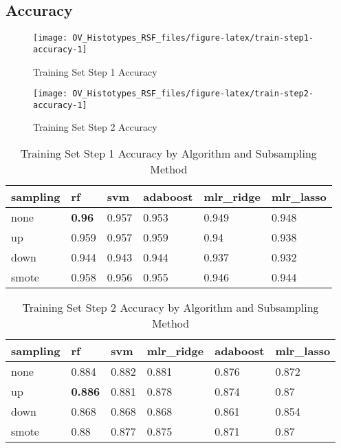 \documentclass[
]{report}
\begin{document}
\hypertarget{accuracy-1}{%
\subsection{Accuracy}\label{accuracy-1}}

\begin{figure}[H]

{\centering \texttt{[image: OV\_Histotypes\_RSF\_files/figure-latex/train-step1-accuracy-1]} 

}

\caption{Training Set Step 1 Accuracy}\label{fig:train-step1-accuracy}
\end{figure}

\begin{figure}[H]

{\centering \texttt{[image: OV\_Histotypes\_RSF\_files/figure-latex/train-step2-accuracy-1]} 

}

\caption{Training Set Step 2 Accuracy}\label{fig:train-step2-accuracy}
\end{figure}

\begin{table}

\caption{\label{tab:train-step1-accuracy-table}Training Set Step 1 Accuracy by Algorithm and Subsampling Method}
\centering
\begin{tabular}[t]{l|l|l|l|l|l}
\hline
sampling & rf & svm & adaboost & mlr\_ridge & mlr\_lasso\\
\hline
none & \textbf{0.96} & 0.957 & 0.953 & 0.949 & 0.948\\
\hline
up & 0.959 & 0.957 & 0.959 & 0.94 & 0.938\\
\hline
down & 0.944 & 0.943 & 0.944 & 0.937 & 0.932\\
\hline
smote & 0.958 & 0.956 & 0.955 & 0.946 & 0.944\\
\hline
\end{tabular}
\end{table}

\begin{table}

\caption{\label{tab:train-step2-accuracy-table}Training Set Step 2 Accuracy by Algorithm and Subsampling Method}
\centering
\begin{tabular}[t]{l|l|l|l|l|l}
\hline
sampling & rf & svm & mlr\_ridge & adaboost & mlr\_lasso\\
\hline
none & 0.884 & 0.882 & 0.881 & 0.876 & 0.872\\
\hline
up & \textbf{0.886} & 0.881 & 0.878 & 0.874 & 0.87\\
\hline
down & 0.868 & 0.868 & 0.868 & 0.861 & 0.854\\
\hline
smote & 0.88 & 0.877 & 0.875 & 0.871 & 0.87\\
\hline
\end{tabular}
\end{table}
\end{document}
